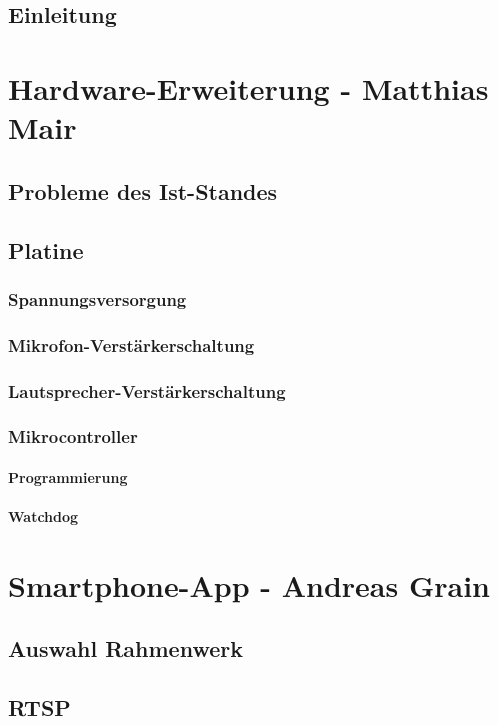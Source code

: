 \documentclass[a4paper, 12pt, twoside, openright
]{memoir}
\begin{document}
\mainmatter
\chapter{Einleitung}


\part{Hardware-Erweiterung - Matthias Mair}
\cleartoverso
\chapter{Probleme des Ist-Standes}
\chapter{Platine}
\section{Spannungsversorgung}
\section{Mikrofon-Verstärkerschaltung}
\section{Lautsprecher-Verstärkerschaltung}
\section{Mikrocontroller}
\subsection{Programmierung}
\subsection{Watchdog}

\part{Smartphone-App - Andreas Grain}
\chapter{Auswahl Rahmenwerk}

\chapter{RTSP}
\end{document}
